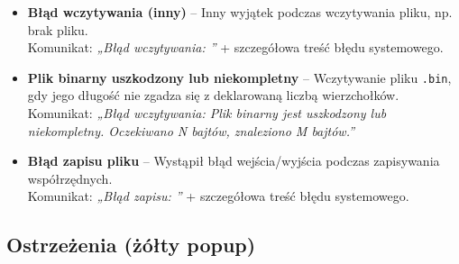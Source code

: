 \documentclass[a4paper, 11pt]{article}
\begin{document}
\begin{itemize}
  \item \textbf{Błąd wczytywania (inny)} – Inny wyjątek podczas wczytywania pliku, np. brak pliku.\\
  Komunikat: \textit{„Błąd wczytywania: ”} + szczegółowa treść błędu systemowego.

  \item \textbf{Plik binarny uszkodzony lub niekompletny} – Wczytywanie pliku \texttt{.bin}, gdy jego długość nie zgadza się z deklarowaną liczbą wierzchołków.\\
  Komunikat: \textit{„Błąd wczytywania: Plik binarny jest uszkodzony lub niekompletny. Oczekiwano N bajtów, znaleziono M bajtów.”}

  \item \textbf{Błąd zapisu pliku} – Wystąpił błąd wejścia/wyjścia podczas zapisywania współrzędnych.\\
  Komunikat: \textit{„Błąd zapisu: ”} + szczegółowa treść błędu systemowego.
\end{itemize}

\subsection*{Ostrzeżenia (żółty popup)}
\end{document}
